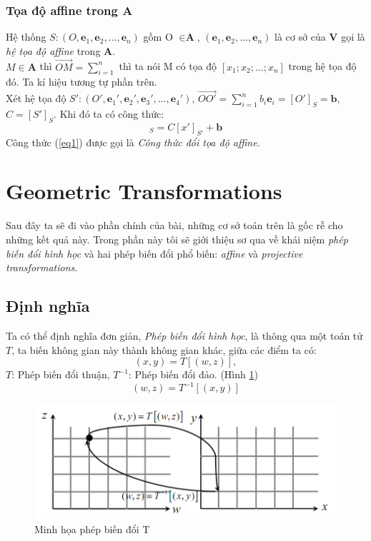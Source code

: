 \documentclass{article}
\begin{document}
\subsubsection*{Tọa độ affine trong A}
Hệ thống $S:(O, \textbf{e}_1, \textbf{e}_2,\ldots, \textbf{e}_n)$ gồm O $\in \textbf{A}$, $(\textbf{e}_1, \textbf{e}_2, \ldots, \textbf{e}_n)$ là cơ sở của \textbf{V} gọi là \textit{hệ tọa độ affine} trong \textbf{A}.\\
$M \in \textbf{A}$ thì $\overrightarrow{OM} = \sum_{i=1}^{n}$ thì ta nói M có tọa độ $[x_1;x_2;\ldots;x_n]$ trong hệ tọa độ đó. Ta kí hiệu tương tự phần trên.\\
Xét hệ tọa độ $S':(O', \textbf{e}_1', \textbf{e}_2', \textbf{e}_3',\ldots, \textbf{e}_4')$, $\overrightarrow{OO'} = \sum_{i=1}^{n}b_i \textbf{e}_i = [O']_S= \textbf{b}$, $C = [S']_{S}$. Khi đó ta có công thức:
\begin{equation}
    [x]_{S} = C[x']_{S'}+\textbf{b}
    \label{eq1}
\end{equation}
Công thức (\ref{eq1}) được gọi là \textit{Công thức đổi tọa độ affine}. 
\section{Geometric Transformations}
Sau đây ta sẽ đi vào phần chính của bài, những cơ sở toán trên là gốc rễ cho những kết quả này. Trong phần này tôi sẽ giới thiệu sơ qua về khái niệm \textit{phép biến đổi hình học} và hai phép biến đổi phổ biến: \textit{affine} và \textit{projective transformations}.
\subsection{Định nghĩa}
Ta có thể định nghĩa đơn giản, \textit{Phép biến đổi hình học}, là thông qua một toán tử $T$, ta biến không gian này thành không gian khác, giữa các điểm ta có:
$$(x,y) = T[(w,z)],$$
$T$: Phép biến đổi thuận, $T^{-1}$: Phép biến đổi đảo. (Hình \ref{fig3})
$$(w,z) = T^{-1}[(x,y)]$$
\begin{figure}[ht!]
    \centering
    \includegraphics[width = 0.75\linewidth]{fig3.png}
    \caption{Minh họa phép biến đổi T}
    \label{fig3}
\end{figure}
\end{document}
